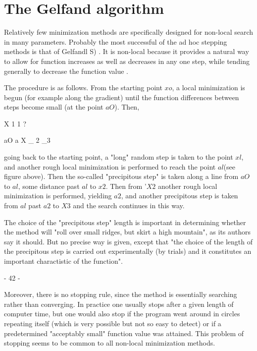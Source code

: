  
\section{The Gelfand algorithm}
 
      Relatively few minimization methods are specifically designed for
non-local search in many parameters. Probably the most successful of
the ad hoc stepping methods is that of Gelfandl S) . It is non-local
because it provides a natural way to allow for function increases as
well as decreases in any one step, while tending generally to decrease
the function value .
 
      The procedure is as follows. From the starting point $xo$, a local
minimization is begun (for example along the gradient) until the function differences between steps become small (at the point $aO$). Then,
 
                        X 1
                          1      ?
 
                  aO              a   X
                                 _ 2     _3
 
 
 
going back to the starting point, a "long" random step is taken to the
point $xl$, and another rough local minimization is performed to reach the
point $al$(see figure above). Then the so-called "precipitous step" is
taken along a line from $aO$ to $al$, some distance past $al$ to $x2$.
Then from '$X2$ another rough local
minimization is performed, yielding $a2$, and another
precipitous step is taken from $al$ past $a2$ to $X3$  and the search
continues in this way.
 
 
      The choice of the "precipitous step" length is important in determining whether the method will "roll over small ridges, but skirt a high
mountain", as its authors say it should. But no precise way is given,
except that "the choice of the length of the precipitous step is carried
out experimentally (by trials) and it constitutes an important
charactistic of the function".
 
 
 
                                - 42 -
 
 
     Moreover, there is no stopping rule, since the method is essentially
searching rather than converging.  In practice one usually stops after
a given length of computer time, but one would also stop if the program
went around in circles repeating itself (which is very possible but not
so easy to detect) or if a predetermined "acceptably small" function
value was attained.  This problem of stopping seems to be common to all
non-local minimization methods.
 
